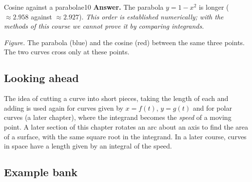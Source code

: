 \documentclass[11pt]{article}
\begin{document}
\begin{exmp}{Cosine against a parabola}{e10}
\textbf{Answer.} The parabola $y=1-x^2$ is longer ($\approx2.958$ against $\approx2.927$). \emph{This order is established numerically; with the methods of this course we cannot prove it by comparing integrands.}
\begin{center}
\par\small\emph{Figure.} The parabola (blue) and the cosine (red) between the same three points. The two curves cross only at these points.
\end{center}
\end{exmp}

\subsection*{Looking ahead}

The idea of cutting a curve into short pieces, taking the length of each and adding is used again for curves given by $x=f(t)$, $y=g(t)$ and for polar curves (a later chapter), where the integrand becomes the \emph{speed} of a moving point. A later section of this chapter rotates an arc about an axis to find the area of a surface, with the same square root in the integrand. In a later course, curves in space have a length given by an integral of the speed.

\subsection*{Example bank}
\end{document}

